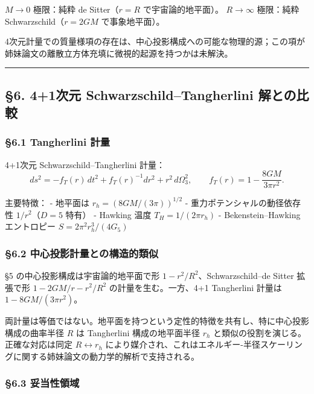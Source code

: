 \documentclass[a4paper,11pt]{ltjsarticle}
\theoremstyle{definition}
\begin{document}
\(M \to 0\) 極限：純粋 de Sitter（\(r = R\) で宇宙論的地平面）。
\(R \to \infty\) 極限：純粋 Schwarzschild（\(r = 2GM\) で事象地平面）。

4次元計量での質量様項の存在は、中心投影構成への可能な物理的源；この項が姉妹論文の離散立方体充填に微視的起源を持つかは未解決。

\begin{center}\rule{0.5\linewidth}{0.5pt}\end{center}

\subsection{§6. 4+1次元 Schwarzschild--Tangherlini
解との比較}\label{ux6b21ux5143-schwarzschildtangherlini-ux89e3ux3068ux306eux6bd4ux8f03}

\subsubsection{§6.1 Tangherlini 計量}\label{tangherlini-ux8a08ux91cf}

4+1次元 Schwarzschild--Tangherlini 計量：
\[ds^2 = -f_T(r)\, dt^2 + f_T(r)^{-1} dr^2 + r^2\, d\Omega_3^2, \qquad f_T(r) = 1 - \frac{8GM}{3\pi r^2}.\]

主要特徴： - 地平面は \(r_h = (8GM/(3\pi))^{1/2}\) -
重力ポテンシャルの動径依存性 \(1/r^2\)（\(D = 5\) 特有） - Hawking 温度
\(T_H = 1/(2\pi r_h)\) - Bekenstein--Hawking エントロピー
\(S = 2\pi^2 r_h^3/(4 G_5)\)

\subsubsection{§6.2
中心投影計量との構造的類似}\label{ux4e2dux5fc3ux6295ux5f71ux8a08ux91cfux3068ux306eux69cbux9020ux7684ux985eux4f3c}

§5 の中心投影構成は宇宙論的地平面で形 \(1 - r^2/R^2\)、Schwarzschild--de
Sitter 拡張で形 \(1 - 2GM/r - r^2/R^2\) の計量を生む。一方、4+1
Tangherlini 計量は \(1 - 8GM/(3\pi r^2)\)。

両計量は等価ではない。地平面を持つという定性的特徴を共有し、特に中心投影構成の曲率半径
\(R\) は Tangherlini 構成の地平面半径 \(r_h\)
と類似の役割を演じる。正確な対応は同定 \(R \leftrightarrow r_h\)
により媒介され、これはエネルギー-半径スケーリングに関する姉妹論文の動力学的解析で支持される。

\subsubsection{§6.3 妥当性領域}\label{ux59a5ux5f53ux6027ux9818ux57df}
\end{document}
